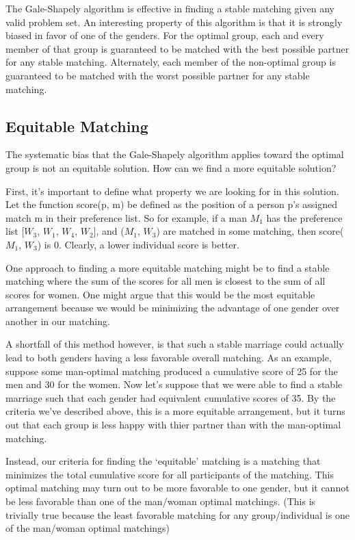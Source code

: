 \documentclass[a4paper]{article}
\begin{document}
The Gale-Shapely algorithm is effective in finding a stable matching given any valid problem set. An interesting property of this algorithm is that it is strongly biased in favor of one of the genders. For the optimal group, each and every member of that group is guaranteed to be matched with the best possible partner for any stable matching. Alternately, each member of the non-optimal group is guaranteed to be matched with the worst possible partner for any stable matching.

\subsection{Equitable Matching}
The systematic bias that the Gale-Shapely algorithm applies toward the optimal group is not an equitable solution. How can we find a more equitable solution?

First, it's important to define what property we are looking for in this solution. Let the function score(p, m) be defined as the position of a person p's assigned match m in their preference list. So for example, if a man $M_1$ has the preference list [$W_3$, $W_1$, $W_4$, $W_2$], and ($M_1$, $W_3$) are matched in some matching, then score($M_1$, $W_3$) is $0$. Clearly, a lower individual score is better.

One approach to finding a more equitable matching might be to find a stable matching where the sum of the scores for all men is closest to the sum of all scores for women. One might argue that this would be the most equitable arrangement because we would be minimizing the advantage of one gender over another in our matching.

A shortfall of this method however, is that such a stable marriage could actually lead to both genders having a less favorable overall matching. As an example, suppose some man-optimal matching produced a cumulative score of 25 for the men and 30 for the women. Now let's suppose that we were able to find a stable marriage such that each gender had equivalent cumulative scores of 35. By the criteria we've described above, this is a more equitable arrangement, but it turns out that each group is less happy with thier partner than with the man-optimal matching.

Instead, our criteria for finding the `equitable' matching is a matching that minimizes the total cumulative score for all participants of the matching. This optimal matching may turn out to be more favorable to one gender, but it cannot be less favorable than one of the man/woman optimal matchings. (This is trivially true because the least favorable matching for any group/individual is one of the man/woman optimal matchings)
\end{document}
